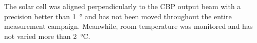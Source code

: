 The solar cell was aligned perpendicularly to the CBP output beam with a precision better than \SI{1}{\degree} and has not been moved throughout the entire measurement campaign. Meanwhile, room temperature was monitored and has not varied more than \SI{2}{\degreeCelsius}.

%


  
